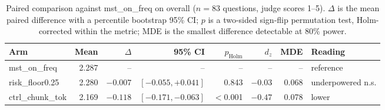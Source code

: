 \begin{table}[t]
\centering
\small
\begin{tabular}{lrrrrrrl}
\toprule
Arm & Mean & $\Delta$ & 95\% CI & $p_{\text{Holm}}$ & $d_z$ & MDE & Reading \\
\midrule
mst\_on\_freq & 2.287 & -- & -- & -- & -- & -- & reference \\
\midrule
risk\_floor0.25 & 2.280 & $-0.007$ & $[-0.055, +0.041]$ & 0.843 & $-0.03$ & 0.068 & underpowered n.s. \\
ctrl\_chunk\_tok & 2.169 & $-0.118$ & $[-0.171, -0.063]$ & $<$0.001 & $-0.47$ & 0.078 & lower \\
\bottomrule
\end{tabular}
\caption{Paired comparison against mst\_on\_freq on overall ($n=83$ questions, judge scores 1--5). $\Delta$ is the mean paired difference with a percentile bootstrap 95\% CI; $p$ is a two-sided sign-flip permutation test, Holm-corrected within the metric; MDE is the smallest difference detectable at 80\% power.}
\label{tab:paired-overall}
\end{table}
